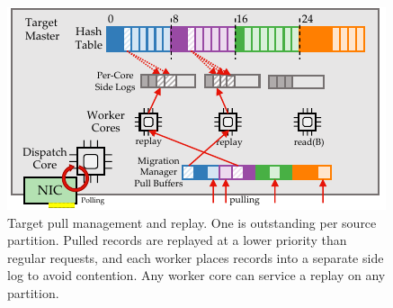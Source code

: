 \begin{figure}[t]
\centering
\includegraphics[width=0.9\columnwidth]{figures/rocksteady-target.pdf}
\caption{Target pull management and replay. One \pull is
  outstanding per source partition. Pulled records are replayed
  at a lower priority than regular requests,
  and each worker places records into
  a separate side log to avoid contention. Any worker core can service a
  replay on any partition.}%
\label{fig:target}%
\end{figure}
